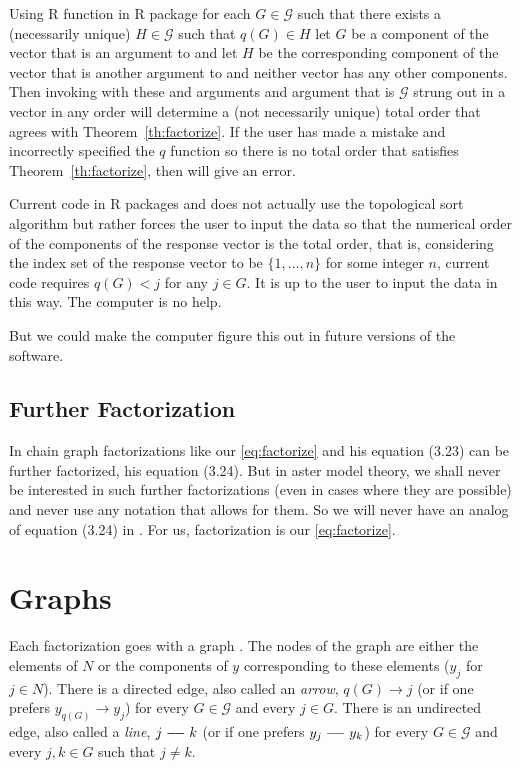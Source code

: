 Using R function  in R package 
\citep{pooh-package}
for each $G \in \mathcal{G}$ such that there exists
a (necessarily unique) $H \in \mathcal{G}$ such that $q(G) \in H$
let $G$ be a component of the vector  that is an argument to
 and
let $H$ be the corresponding component of the vector  that is another
argument to  and
neither vector has any other components.  Then invoking  with
these  and  arguments and  argument that is
$\mathcal{G}$ strung out in a vector in any order
will determine a (not necessarily unique) total order that agrees with
Theorem~\ref{th:factorize}.  If the user has made a mistake and incorrectly
specified the $q$ function so there is no total order that satisfies
Theorem~\ref{th:factorize}, then  will give an error.

Current code in R packages  and  does not
actually use the topological sort algorithm but rather forces the user
to input the data so that the numerical order of the components of the
response vector is the total order, that is, considering the index set
of the response vector to be $\{1, \ldots, n\}$ for some integer $n$,
current code requires $q(G) < j$ for any $j \in G$.
It is up to the user to input the data in this way.  The computer is no help.

But we could make the computer figure this out in future versions of the
software.

\subsection{Further Factorization}
\label{sec:further-factorize}

In \citet{lauritzen} chain graph factorizations like our \eqref{eq:factorize}
and his equation (3.23) can be further factorized, his equation (3.24).
But in aster model theory, we shall never be interested in such further
factorizations (even in cases where they are possible) and never use any
notation that allows for them.  So we will never have an analog of equation
(3.24) in \citet{lauritzen}.  For us, factorization is our \eqref{eq:factorize}.

\section{Graphs}

Each factorization goes with a graph \citep[Section~3.2.3]{lauritzen}.
The nodes of the graph are either the elements of $N$ or the components
of $y$ corresponding to these elements ($y_j$ for $j \in N$).
There is a directed edge, also called an \emph{arrow},
$q(G) \longrightarrow j$ (or if one prefers $y_{q(G)} \longrightarrow y_j$)
for every $G \in \mathcal{G}$ and every $j \in G$.
There is an undirected edge, also called a \emph{line},
$j \myline k$ (or if one prefers $y_j \myline y_k$)
for every $G \in \mathcal{G}$ and every $j, k \in G$ such that $j \neq k$.

